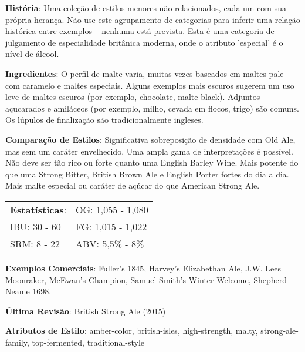\textbf{História}: Uma coleção de estilos menores não relacionados, cada um com sua própria herança. Não use este agrupamento de categorias para inferir uma relação histórica entre exemplos – nenhuma está prevista. Esta é uma categoria de julgamento de especialidade britânica moderna, onde o atributo 'especial' é o nível de álcool.

\textbf{Ingredientes}: O perfil de malte varia, muitas vezes baseados em maltes pale com caramelo e maltes especiais. Alguns exemplos mais escuros sugerem um uso leve de maltes escuros (por exemplo, chocolate, malte black). Adjuntos açucarados e amiláceos (por exemplo, milho, cevada em flocos, trigo) são comuns. Os lúpulos de finalização são tradicionalmente ingleses.

\textbf{Comparação de Estilos}: Significativa sobreposição de densidade com Old Ale, mas sem um caráter envelhecido. Uma ampla gama de interpretações é possível. Não deve ser tão rico ou forte quanto uma English Barley Wine. Mais potente do que uma Strong Bitter, British Brown Ale e English Porter fortes do dia a dia. Mais malte especial ou caráter de açúcar do que American Strong Ale.

\begin{tabular}{@{}p{35mm}p{35mm}@{}}
  \textbf{Estatísticas}: & OG: 1,055 - 1,080 \\
  IBU: 30 - 60  & FG: 1,015 - 1,022  \\
  SRM: 8 - 22  & ABV: 5,5\% - 8\%
\end{tabular}

\textbf{Exemplos Comerciais}: Fuller’s 1845, Harvey’s Elizabethan Ale, J.W. Lees Moonraker, McEwan’s Champion, Samuel Smith’s Winter Welcome, Shepherd Neame 1698.

\textbf{Última Revisão}: British Strong Ale (2015)

\textbf{Atributos de Estilo}: amber-color, british-isles, high-strength, malty, strong-ale-family, top-fermented, traditional-style
